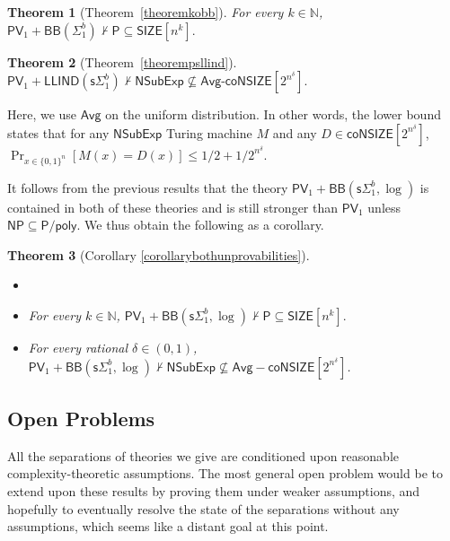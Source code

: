 \documentclass[11pt]{article}
\newcommand{\poly}{\mathsf{poly}}
\newcommand{\N}{\mathbb{N}}
\renewcommand{\P}{\mathsf{P}}
\newcommand{\NP}{\mathsf{NP}}
\newcommand{\PV}{\mathsf{PV}}
\newtheorem{theorem}{Theorem}[section]
\theoremstyle{definition}
\theoremstyle{definition}
\theoremstyle{remark}
\begin{document}
\begin{theorem}[Theorem~\ref{theoremkobb}]\label{thm:krajicekoliveira}
For every $k \in \N$,
        $
        \PV_1+\mathsf{BB}(\Sigma^b_1) \not\vdash \P\subseteq \mathsf{SIZE}[n^k].
        $
\end{theorem}
\begin{theorem}[Theorem~\ref{theorempsllind}]\label{thm:pichsanthanam}
        $
        \PV_1+\mathsf{LLIND}(\mathsf{s}\Sigma^b_1) \nvdash \mathsf{NSubExp} \not\subseteq \mathsf{Avg}\text{-} \mathsf{coNSIZE}[2^{n^\delta}].
        $
\end{theorem}

Here, we use $\mathsf{Avg}$ on the uniform distribution. In other words, the lower bound states that for any $\mathsf{NSubExp}$ Turing machine $M$ and any $D\in \mathsf{coNSIZE}[2^{n^\delta}]$, $\Pr_{x\in \{0,1\}^n}[M(x)=D(x)]\leq 1/2 + 1/2^{n^\delta}$.


It follows from the previous results that the theory $\PV_1+\mathsf{BB}(\mathsf{s}\Sigma^b_1,\log)$ is contained in both of these theories and is still stronger than $\PV_1$ unless $\NP\subseteq\P/\poly$. We thus obtain the following as a corollary.

\begin{theorem}[Corollary \ref{corollarybothunprovabilities}]
\begin{itemize}
    \item[]
    \item For every $k \in \N$, $\PV_1+\mathsf{BB}(\mathsf{s}\Sigma^b_1,\log)\not\vdash \P\subseteq \mathsf{SIZE}[n^k].$
    \item For every rational $\delta\in (0,1)$, $\PV_1+\mathsf{BB}(\mathsf{s}\Sigma^b_1,\log) \nvdash  \mathsf{NSubExp} \not\subseteq \mathsf{Avg-} \mathsf{coNSIZE}[2^{n^\delta}]$.
\end{itemize}
\end{theorem}



\subsection{Open Problems}

All the separations of theories we give are conditioned upon reasonable complexity-theoretic assumptions. The most general open problem would be to extend upon these results by proving them under weaker assumptions, and hopefully to eventually resolve the state of the separations without any assumptions, which seems like a distant goal at this point.
\end{document}
